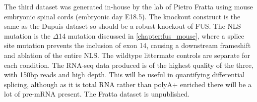 The third dataset was generated in-house by the lab of Pietro Fratta using mouse embryonic spinal cords (embryonic day E18.5). The knockout construct is the same as the Dupuis dataset so should be a robust knockout of FUS. 
The NLS mutation is the $\Delta$14 mutation discussed in \autoref{chapter:fus_mouse}, where a splice site mutation prevents the inclusion of exon 14, causing a downstream frameshift and ablation of the entire NLS. 
The wildtype littermate controls are separate for each condition. 
The RNA-seq data produced is of the highest quality of the three, with 150bp reads and high depth. 
This will be useful in quantifying differential splicing, although as it is total RNA rather than polyA+ enriched there will be a lot of pre-mRNA present.
The Fratta dataset is unpublished.





